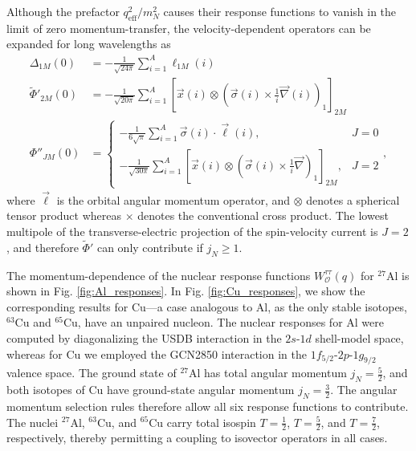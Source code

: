 \documentclass{book}[letterpaper,12pt]
\begin{document}
Although the prefactor $q_\mathrm{eff}^2/m_N^2$ causes their response functions to vanish in the limit of zero momentum-transfer, the velocity-dependent operators can be expanded for long wavelengths as
\begin{equation}
\begin{split}
\Delta_{1M}(0)&=-\frac{1}{\sqrt{24\pi}}\sum_{i=1}^A\ell_{1M}(i)\\
\tilde{\Phi}'_{2M}(0)&=-\frac{1}{\sqrt{20\pi}}\sum_{i=1}^A\left[\vec{x}(i)\otimes\left(\vec{\sigma}(i)\times\frac{1}{i}\vec{\nabla}(i)\right)_1\right]_{2M}\\
\Phi''_{JM}(0)&=\left\{\begin{array}{cc}
-\frac{1}{6\sqrt{\pi}}\sum_{i=1}^A\vec{\sigma}(i)\cdot\vec{\ell}(i), & J=0\\
-\frac{1}{\sqrt{30\pi}}\sum_{i=1}^A\left[\vec{x}(i)\otimes\left(\vec{\sigma}(i)\times\frac{1}{i}\vec{\nabla}\right)_1\right]_{2M}, & J=2
\end{array}\right.,
\end{split}
\end{equation}
where $\vec{\ell}$ is the orbital angular momentum operator, and $\otimes$ denotes a spherical tensor product whereas $\times$ denotes the conventional cross product. The lowest multipole of the transverse-electric projection of the spin-velocity current is $J=2$, and therefore $\tilde{\Phi}'$ can only contribute if $j_N\geq 1$.

The momentum-dependence of the nuclear response functions $W^{\tau\tau}_\mathcal{O}(q)$ for $^{27}$Al is shown in Fig. \ref{fig:Al_responses}. In Fig. \ref{fig:Cu_responses}, we show the corresponding results for Cu---a case analogous to Al, as the only stable isotopes, $^{63}$Cu and $^{65}$Cu, have an unpaired nucleon. The nuclear responses for Al were computed by diagonalizing the USDB interaction in the $2s$-$1d$ shell-model space, whereas for Cu we employed the GCN2850 interaction in the $1f_{5/2}$-$2p$-$1g_{9/2}$ valence space. The ground state of $^{27}$Al has total angular momentum $j_N=\frac{5}{2}$, and both isotopes of Cu have ground-state angular momentum $j_N=\frac{3}{2}$. The angular momentum selection rules therefore allow all six response functions to contribute. The nuclei $^{27}$Al, $^{63}$Cu, and $^{65}$Cu carry total isospin $T=\frac{1}{2}$, $T=\frac{5}{2}$, and $T=\frac{7}{2}$, respectively, thereby permitting a coupling to isovector operators in all cases.
\end{document}
